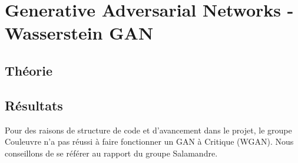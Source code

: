 \chapter{Generative Adversarial Networks - Wasserstein GAN}
\section{Théorie}

\section{Résultats}
Pour des raisons de structure de code et d'avancement dans le projet, le groupe Couleuvre n'a pas réussi à faire fonctionner un GAN à Critique (WGAN). Nous conseillons de se référer au rapport du groupe Salamandre.